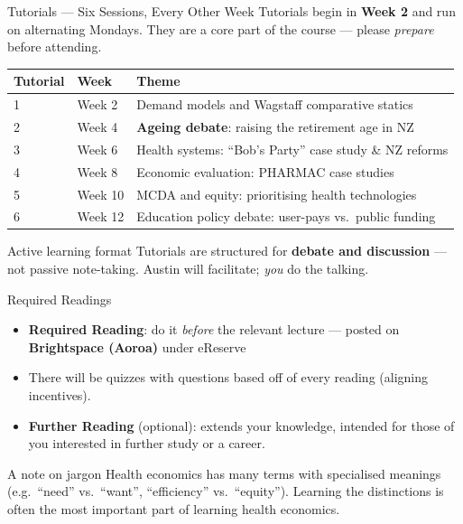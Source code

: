 \documentclass[aspectratio=169, 12pt]{beamer}
\begin{document}
\begin{frame}{Tutorials — Six Sessions, Every Other Week}
  Tutorials begin in \textbf{Week 2} and run on alternating Mondays.
  They are a core part of the course --- please \emph{prepare} before attending.
  \vspace{0.5em}
  \begin{tabular}{@{}lll@{}}
    \toprule
    \textbf{Tutorial} & \textbf{Week} & \textbf{Theme} \\
    \midrule
    1 & Week 2  & Demand models and Wagstaff comparative statics \\
    2 & Week 4  & \textbf{Ageing debate}: raising the retirement age in NZ \\
    3 & Week 6  & Health systems: ``Bob's Party'' case study \& NZ reforms \\
    4 & Week 8  & Economic evaluation: PHARMAC case studies \\
    5 & Week 10 & MCDA and equity: prioritising health technologies \\
    6 & Week 12 & Education policy debate: user-pays vs.\ public funding \\
    \bottomrule
  \end{tabular}
  \vspace{0.5em}
  \begin{alertblock}{Active learning format}
    Tutorials are structured for \textbf{debate and discussion} --- not passive note-taking.
    Austin will facilitate; \emph{you} do the talking.
  \end{alertblock}
\end{frame}

\begin{frame}{Required Readings}
  \begin{itemize}
    \item \textbf{Required Reading}: do it \emph{before} the relevant lecture --- posted on
          \textbf{Brightspace (Aoroa)} under eReserve
    \item There will be quizzes with questions based off of every reading (aligning incentives).
    \item \textbf{Further Reading} (optional): extends your knowledge, intended for those of you interested in further study or a career.
  \end{itemize}
  \vspace{0.4em}
  \begin{block}{A note on jargon}
    Health economics has many terms with specialised meanings (e.g.\ ``need'' vs.\ ``want'',
    ``efficiency'' vs.\ ``equity''). Learning the distinctions is often the most important part of
    learning health economics.
  \end{block}
\end{frame}
\end{document}
